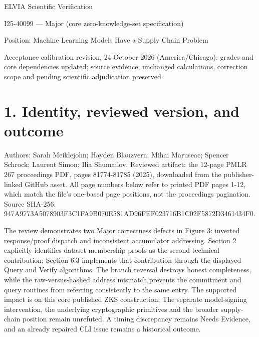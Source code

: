 \documentclass[10pt]{article}
\begin{document}
ELVIA Scientific Verification\par
I25-40099 — Major (core zero-knowledge-set specification)\par
Position: Machine Learning Models Have a Supply Chain Problem\par
Acceptance calibration revision, 24 October 2026 (America/Chicago): grades and core dependencies updated; source evidence, unchanged calculations, correction scope and pending scientific adjudication preserved.\par
\section*{1. Identity, reviewed version, and outcome}
Authors: Sarah Meiklejohn; Hayden Blauzvern; Mihai Maruseac; Spencer Schrock; Laurent Simon; Ilia Shumailov. Reviewed artifact: the 12-page PMLR 267 proceedings PDF, pages 81774-81785 (2025), downloaded from the publisher-linked GitHub asset. All page numbers below refer to printed PDF pages 1-12, which match the file’s one-based page positions, not the proceedings pagination. Source SHA-256: 947A9773A5078903F3C1FA9B070E581AD96FEF023716B1C02F5872D3461434F0.\par
The review demonstrates two Major correctness defects in Figure 3: inverted response/proof dispatch and inconsistent accumulator addressing. Section 2 explicitly identifies dataset membership proofs as the second technical contribution; Section 6.3 implements that contribution through the displayed Query and Verify algorithms. The branch reversal destroys honest completeness, while the raw-versus-hashed address mismatch prevents the commitment and query routines from referring consistently to the same entry. The supported impact is on this core published ZKS construction. The separate model-signing intervention, the underlying cryptographic primitives and the broader supply-chain position remain unrefuted. A timing discrepancy remains Needs Evidence, and an already repaired CLI issue remains a historical outcome.\par
\end{document}
